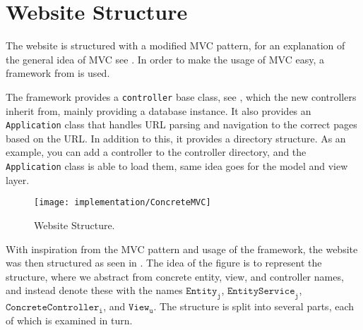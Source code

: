 \section{Website Structure}\label{sec:websitestructure}
The website is structured with a modified MVC pattern, for an explanation of the general idea of MVC see .
In order to make the usage of MVC easy, a framework from \citep{misc:mvc-framework} is used.

The framework provides a \texttt{controller} base class, see , which the new controllers inherit from, mainly providing a database instance.
It also provides an \texttt{Application} class that hand\-les URL parsing and navigation to the correct pages based on the URL.
In addition to this, it provides a directory structure. As an example, you can add a controller to the controller directory, and the \texttt{Application} class is able to load them, same idea goes for the model and view layer.

\begin{figure}[h]
	\centering
	\texttt{[image: implementation/ConcreteMVC]}
	\caption{Website Structure.}\label{fig:websitestructure}
\end{figure}

With inspiration from the MVC pattern and usage of the framework, the website was then structured as seen in .
The idea of the figure is to represent the structure, where we abstract from concrete entity, view, and controller names, and instead denote these with the names $\texttt{Entity}_\texttt{j}$, $\texttt{EntityService}_\texttt{j}$, $\texttt{ConcreteController}_\texttt{i}$, and $\texttt{View}_\texttt{u}$.
The structure is split into several parts, each of which is examined in turn. 

